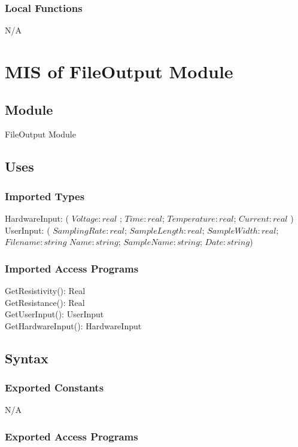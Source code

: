 \documentclass[12pt, titlepage]{article}
\begin{document}
\subsubsection{Local Functions}
N/A

\newpage

\section{MIS of FileOutput Module} \label{Module} 

\subsection{Module}

FileOutput Module

\subsection{Uses}

\subsubsection{Imported Types}

HardwareInput: ( $Voltage: real $ ; $Time: real$; $Temperature: real$; $Current: real$ )\\
UserInput: ( $SamplingRate: real$; $SampleLength: real$; $SampleWidth: real$; $Filename: string$ $Name: string$; $SampleName: string$; $Date: string$)

\subsubsection{Imported Access Programs}
  GetResistivity(): Real\\
  GetResistance(): Real\\
  GetUserInput(): UserInput\\
  GetHardwareInput(): HardwareInput

\subsection{Syntax}

\subsubsection{Exported Constants}

N/A

\subsubsection{Exported Access Programs}
\end{document}
